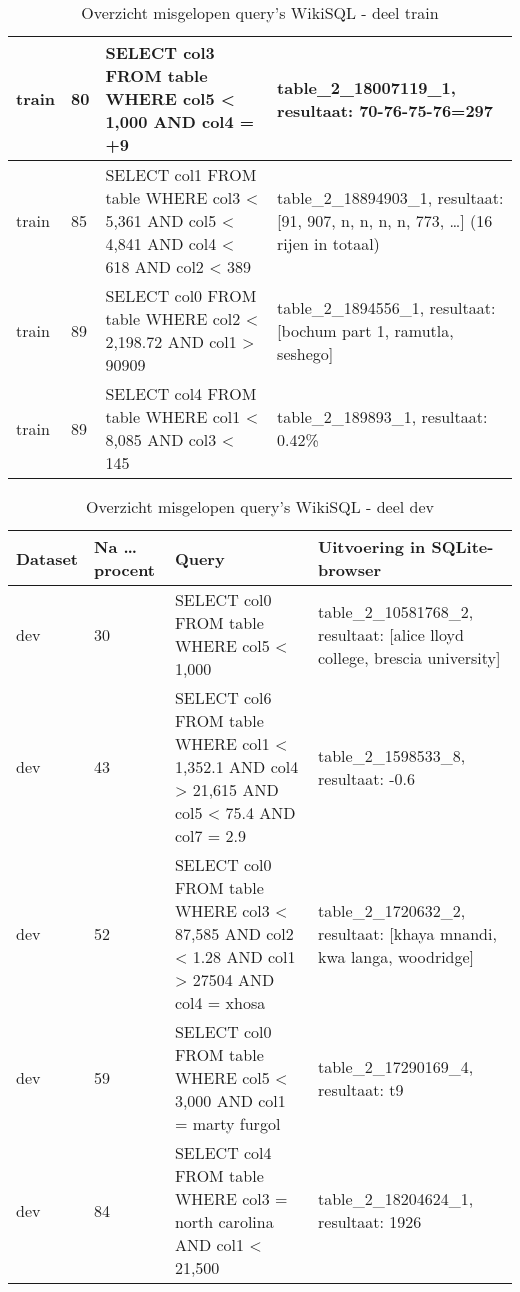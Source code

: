 \begin{table}[]
\begin{tabular}{ | l | l | p{5cm} | p{5cm} |}
		train 	& 80 			   & SELECT col3 FROM table WHERE col5 < 1,000 AND col4 = +9 & table\_2\_18007119\_1, resultaat: 70-76-75-76=297  \\ \hline
		train 	& 85 			   & SELECT col1 FROM table WHERE col3 < 5,361 AND col5 < 4,841 AND col4 < 618 AND col2 < 389 & table\_2\_18894903\_1, resultaat: [91, 907, n, n, n, n, 773, \dots] (16 rijen in totaal)  \\ \hline
		train	& 89 			   & SELECT col0 FROM table WHERE col2 < 2,198.72 AND col1 > 90909 & table\_2\_1894556\_1, resultaat: [bochum part 1, ramutla, seshego]  \\ \hline
		train	& 89 			   & SELECT col4 FROM table WHERE col1 < 8,085 AND col3 < 145 & table\_2\_189893\_1, resultaat: 0.42\%  \\ \hline
	\end{tabular}
	\caption{Overzicht misgelopen query's WikiSQL - deel train}
	\label{table:wikisqlerrorstrain}
\end{table}

\begin{table}[]
	\centering
	\begin{tabular}{ | l | l | p{5cm} | p{5cm} |}
		\hline
		Dataset & Na \dots procent & Query & Uitvoering in SQLite-browser \\ \hline
		dev 	& 30 			   & SELECT col0 FROM table WHERE col5 < 1,000 & table\_2\_10581768\_2, resultaat: [alice lloyd college, brescia university]  \\ \hline
		dev 	& 43 			   & SELECT col6 FROM table WHERE col1 < 1,352.1 AND col4 > 21,615 AND col5 < 75.4 AND col7 = 2.9  & table\_2\_1598533\_8, resultaat: -0.6  \\ \hline
		dev 	& 52 			   & SELECT col0 FROM table WHERE col3 < 87,585 AND col2 < 1.28 AND col1 > 27504 AND col4 = xhosa & table\_2\_1720632\_2, resultaat: [khaya mnandi, kwa langa, woodridge]  \\ \hline
		dev 	& 59 			   & SELECT col0 FROM table WHERE col5 < 3,000 AND col1 = marty furgol & table\_2\_17290169\_4, resultaat: t9  \\ \hline
		dev 	& 84 			   & SELECT col4 FROM table WHERE col3 = north carolina AND col1 < 21,500 & table\_2\_18204624\_1, resultaat: 1926  \\ \hline
	\end{tabular}
	\caption{Overzicht misgelopen query's WikiSQL - deel dev}
	\label{table:wikisqlerrorsdev}
\end{table}

